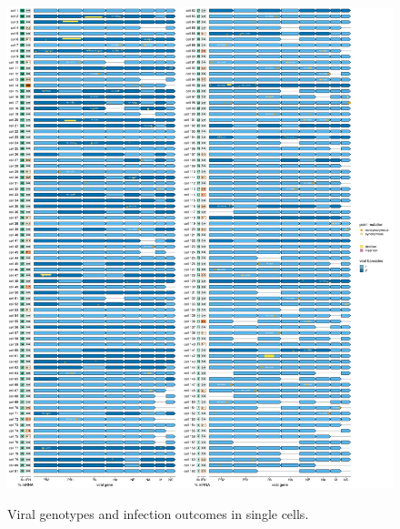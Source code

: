 \documentclass[9pt,lineno]{elife}
\begin{document}
\begin{figure}
\begin{fullwidth}
{\centering
\includegraphics[width=0.9\linewidth]{figures/p_genotypes.pdf}
}
\caption{
Viral genotypes and infection outcomes in single cells.
}
\label{fig:genotypes}


\end{fullwidth}
\end{figure}
\end{document}
